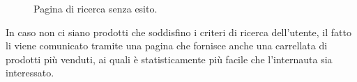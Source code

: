 \begin{figure}[!htb]
	\caption{\label{fig:figura8}} Pagina di ricerca senza esito.
\end{figure}

In caso non ci siano prodotti che soddisfino i criteri di ricerca dell'utente, il fatto li viene comunicato tramite una pagina che fornisce anche una carrellata di prodotti più venduti, ai quali è statisticamente più facile che l'internauta sia interessato.

